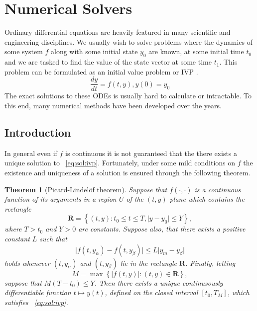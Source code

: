 \documentclass[11pt]{article}
\newtheorem{theorem}{Theorem}
\begin{document}
    \section{Numerical Solvers}
    Ordinary differential equations are heavily featured in many scientific and engineering disciplines.
    We usually wish to solve problems where the dynamics of some system $f$ along with some initial state $y_0$ are
    known, at some initial time $t_0$ and we are tasked to find the value of the state vector at some time $t_1$.
    This problem can be formulated as an initial value problem or IVP .
    \begin{equation}
        \label{eq:sol:ivp}
        \frac{dy}{dt} = f(t, y), y(0) = y_0
    \end{equation}
    The exact solutions to these ODEs is usually hard to calculate or intractable.
    To this end, many numerical methods have been developed over the years.

    \subsection{Introduction}
    In general even if $f$ is continuous it is not guaranteed that the there exists a unique solution to
    ~\eqref{eq:sol:ivp}.
    Fortunately, under some mild conditions on $f$ the existence and uniqueness of a solution is ensured through the
    following theorem.

    \begin{theorem}[Picard-Lindel\"of theorem]
        Suppose that $f(\cdot , \cdot )$ is a continuous function of its arguments in a region $U$ of the $(t, y)$ plane
        which contains the rectangle
        \begin{equation*}
            \pmb{R}  = \left\{ (t,y) : t_0 \leq t \leq T , \lvert y - y_0 \rvert \leq Y \right\} ,
        \end{equation*}
        where $T > t_0$ and $Y > 0$ are constants.
        Suppose also, that there exists a positive constant $L$ such that
        \begin{equation}
            \label{eq:sol:lipsitz}
            \lvert f(t, y_{\alpha}) - f(t, y_\beta) \rvert \leq L \lvert y_m - y_\beta \rvert
        \end{equation}
        holds whenever $(t, y_\alpha)$ and $(t, y_\beta)$ lie in the rectangle $\pmb{R}$.
        Finally, letting
        \begin{equation*}
            M = \max\left\{\lvert f(t, y) \rvert : (t, y) \in \pmb{R} \right\} ,
        \end{equation*}
        suppose that $M(T - t_0) \leq Y$.
        Then there exists a unique continusously differentiable function $t \mapsto y(t)$, defined on the closed
        interval $[t_0, T_M]$, which satisfies ~\eqref{eq:sol:ivp}.
    \end{theorem}
\end{document}
